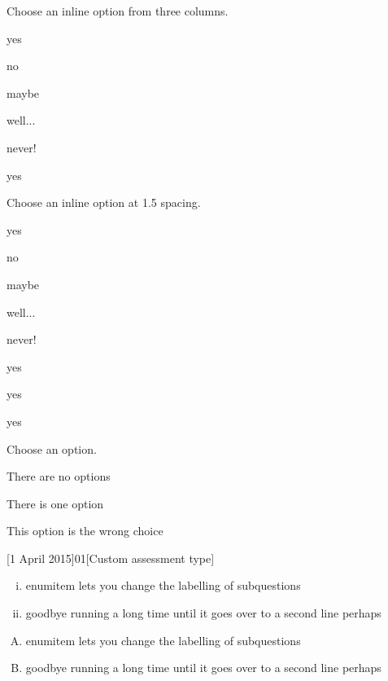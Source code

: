 \documentclass{ouab}
\begin{document}
Choose an inline option from three columns.

\begin{inlineoptions}{3} %
\item yes
\item no
\item maybe
\item well...
\item never!
\item yes
\end{inlineoptions}

\question*
Choose an inline option at 1.5 spacing.
\begin{inlineoptions}[1.5]{3} %
\item yes
\item no
\item maybe
\item well...
\item never!
\item yes
\item yes
\item yes
\noitem %
\end{inlineoptions}

Choose an option.
\begin{options}
\item There are no options
\item There is one option
\item This option is the wrong choice
\end{options}


[1 April 2015]{01}[Custom assessment type]

\begin{enumerate}[(i)]
\item enumitem lets you change the labelling of subquestions
\item goodbye running a long time until it goes over to a second line perhaps
\end{enumerate}

\begin{enumerate}[(A)]
\item enumitem lets you change the labelling of subquestions
\item goodbye running a long time until it goes over to a second line perhaps
\end{enumerate}
\end{document}
